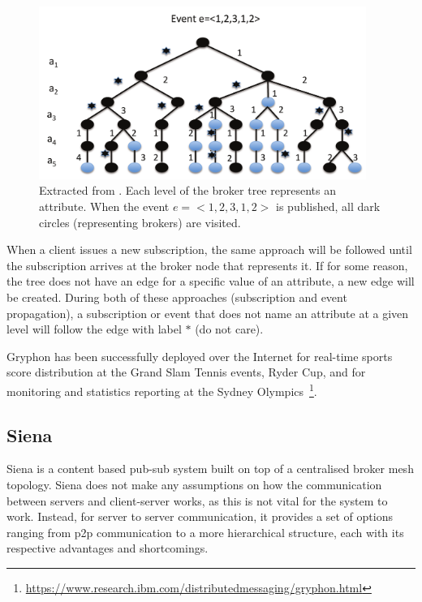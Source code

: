 \begin{figure}[hb!]
  \centering
  \includegraphics[width=0.95\textwidth]{img/gryphon.png}
  \caption{Extracted from \cite{Kermarrec2013}. Each level of the broker tree represents an attribute.
  When the event $e = <1, 2, 3, 1, 2>$ is published,
  all dark circles (representing brokers) are visited.}
  \label{fig:gryphon}
\end{figure}

When a client issues a new subscription, the same approach will be
followed until the subscription arrives at the broker node that
represents it. If for some reason, the tree does not have an edge for a
specific value of an attribute, a new edge will be created. During both
of these approaches (subscription and event propagation), a subscription
or event that does not name an attribute at a given level will follow
the edge with label $*$ (do not care).

Gryphon has been successfully deployed over the Internet for real-time
sports score distribution at the Grand Slam Tennis events, Ryder Cup,
and for monitoring and statistics reporting at the Sydney Olympics~\footnote{\url{https://www.research.ibm.com/distributedmessaging/gryphon.html}}.

\subsection{Siena}\label{siena}

Siena \cite{Carzaniga2003} is a content based pub-sub system built
on top of a centralised broker mesh topology. Siena does not make any
assumptions on how the communication between servers and client-server
works, as this is not vital for the system to work. Instead, for server
to server communication, it provides a set of options ranging from \acrshort{p2p}
communication to a more hierarchical structure, each with its respective
advantages and shortcomings.

